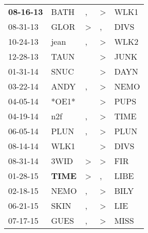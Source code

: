 \begin{supertabular}{p{0.07\textwidth}p{0.06\textwidth}p{0.02\textwidth}p{0.02\textwidth}p{0.06\textwidth}}
 \textbf{08-16-13\textsuperscript{}} &           BATH\textsuperscript{} &                , &  \textgreater &           WLK1\textsuperscript{} \\
          08-31-13\textsuperscript{} &           GLOR\textsuperscript{} &     \textgreater &             , &           DIVS\textsuperscript{} \\
          10-24-13\textsuperscript{} &           jean\textsuperscript{} &                , &  \textgreater &           WLK2\textsuperscript{} \\
          12-28-13\textsuperscript{} &           TAUN\textsuperscript{} &                  &  \textgreater &           JUNK\textsuperscript{} \\
          01-31-14\textsuperscript{} &           SNUC\textsuperscript{} &                  &  \textgreater &           DAYN\textsuperscript{} \\
          03-22-14\textsuperscript{} &           ANDY\textsuperscript{} &                , &  \textgreater &           NEMO\textsuperscript{} \\
          04-05-14\textsuperscript{} &                            *OE1* &                  &  \textgreater &           PUPS\textsuperscript{} \\
          04-19-14\textsuperscript{} &            n2f\textsuperscript{} &                , &  \textgreater &           TIME\textsuperscript{} \\
          06-05-14\textsuperscript{} &           PLUN\textsuperscript{} &                , &  \textgreater &           PLUN\textsuperscript{} \\
          08-14-14\textsuperscript{} &           WLK1\textsuperscript{} &                  &  \textgreater &           DIVS\textsuperscript{} \\
          08-31-14\textsuperscript{} &           3WID\textsuperscript{} &     \textgreater &  \textgreater &            FIR\textsuperscript{} \\
          01-28-15\textsuperscript{} &  \textbf{TIME\textsuperscript{}} &     \textgreater &             , &           LIBE\textsuperscript{} \\
          02-18-15\textsuperscript{} &           NEMO\textsuperscript{} &                , &  \textgreater &           BILY\textsuperscript{} \\
          06-21-15\textsuperscript{} &           SKIN\textsuperscript{} &                , &  \textgreater &            LIE\textsuperscript{} \\
          07-17-15\textsuperscript{} &           GUES\textsuperscript{} &                , &  \textgreater &           MISS\textsuperscript{} \\

\end{supertabular}
